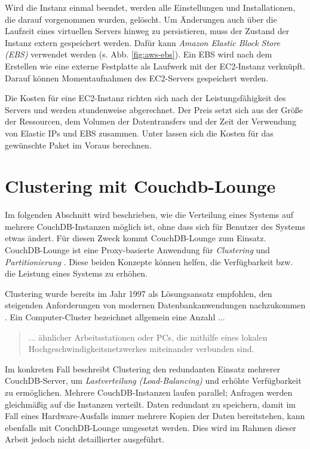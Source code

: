Wird die Instanz einmal beendet, werden alle Einstellungen und Installationen, die darauf vorgenommen wurden, gelöscht. Um Änderungen auch über die Laufzeit eines virtuellen Servers hinweg zu persistieren, muss der Zustand der Instanz extern gespeichert werden. Dafür kann \textit{Amazon Elastic Block Store (EBS)} verwendet werden (s. Abb. \ref{fig:aws-ebs}). Ein EBS wird nach dem Erstellen wie eine externe Festplatte als Laufwerk mit der EC2-Instanz verknüpft. Darauf können Momentaufnahmen des EC2-Servers gespeichert werden.

Die Kosten für eine EC2-Instanz richten sich nach der Leistungsfähigkeit des Servers und werden stundenweise abgerechnet. Der Preis setzt sich aus der Größe der Ressourcen, dem Volumen der Datentransfers und der Zeit der Verwendung von Elastic IPs und EBS zusammen. Unter \cite{aws:preistabelle} lassen sich die Kosten für das gewünschte Paket im Voraus berechnen.



\section{Clustering mit Couchdb-Lounge}
\label{subsec:lounge}


Im folgenden Abschnitt wird beschrieben, wie die Verteilung eines Systems auf mehrere CouchDB-Instanzen möglich ist, ohne dass sich für Benutzer des Systems etwas ändert. Für diesen Zweck kommt CouchDB-Lounge \cite{lounge:website} zum Einsatz. CouchDB-Lounge ist eine Proxy-basierte Anwendung für \textit{Clustering} und \textit{Partitionierung} \cite{lounge:SOC}. Diese beiden Konzepte können helfen, die Verfügbarkeit bzw. die Leistung eines
Systems zu erhöhen.

Clustering wurde bereits im Jahr 1997 als Lösungsansatz empfohlen, den steigenden Anforderungen von modernen Datenbankanwendungen nachzukommen . Ein Computer-Cluster bezeichnet allgemein eine Anzahl ...

\begin{quote}
... ähnlicher Arbeitsstationen oder PCs, die mithilfe eines lokalen Hochgeschwindigkeitsnetzwerkes miteinander verbunden sind. 
\end{quote}

Im konkreten Fall beschreibt Clustering den redundanten Einsatz mehrerer CouchDB-Server, um \textit{Lastverteilung (Load-Balancing)} und erhöhte Verfügbarkeit zu ermöglichen. Mehrere CouchDB-Instanzen laufen parallel; Anfragen werden gleichmäßig auf die Instanzen verteilt. Daten redundant zu speichern, damit im Fall eines Hardware-Ausfalls immer mehrere Kopien der Daten bereitstehen, kann ebenfalls mit CouchDB-Lounge umgesetzt werden. Dies wird im Rahmen dieser Arbeit jedoch nicht detaillierter ausgeführt.

